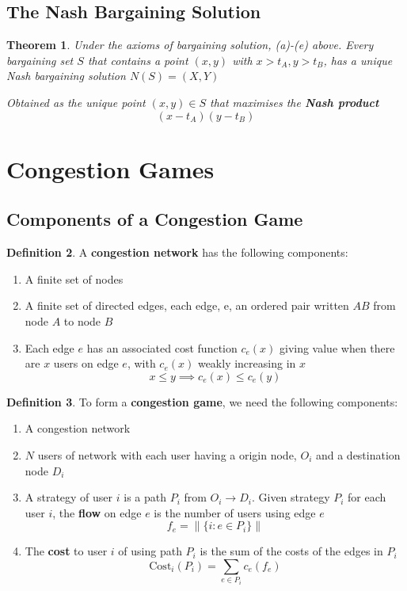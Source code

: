 \documentclass[11pt]{article}
\theoremstyle{plain}
\newtheorem{theorem}{Theorem}[section]
\theoremstyle{definition}
\newtheorem{definition}[theorem]{Definition}
\theoremstyle{remark}
\begin{document}
\subsection{The Nash Bargaining Solution}

\begin{theorem}
    Under the axioms of bargaining solution, (a)-(e) above. Every bargaining set \(S\) that contains a point \((x,y)\) with \(x > t_A, y > t_B\), has a unique Nash bargaining solution \(N(S) = (X,Y)\)

    Obtained as the unique point \((x,y) \in S\) that maximises the \textbf{Nash product}
    \[
        (x - t_{A})(y - t_{B})
    \]
\end{theorem}

\section{Congestion Games}

\setcounter{subsection}{4} 
\subsection{Components of a Congestion Game}
\setcounter{theorem}{33}

\begin{definition}
    A \textbf{congestion network} has the following components:
    \begin{enumerate}
        \item A finite set of nodes
        \item A finite set of directed edges, each edge, e, an ordered pair written \(AB\) from node \(A\) to node \(B\)
        \item Each edge \(e\) has an associated cost function \(c_{e}(x)\) giving value when there are \(x\) users on edge \(e\), with \(c_{e}(x)\) weakly increasing in \(x\)
        \[
            x \leq y \implies c_{e}(x) \leq c_{e}(y)
        \]
    \end{enumerate}
\end{definition}

\begin{definition}
    To form a \textbf{congestion game}, we need the following components:
    \begin{enumerate}
        \item A congestion network
        \item \(N\) users of network with each user having a origin node, \(O_{i}\) and a destination node \(D_{i}\) 
        \item A strategy of user \(i\) is a path \(P_{i}\) from \(O_{i} \to D_{i}\). Given strategy \(P_{i}\) for each user \(i\), the \textbf{flow} on edge \(e\) is the number of users using edge \(e\)
        \[
            f_{e} = \left\lVert \{i : e \in P_{i}\}\right\rVert 
        \]
        \item The \textbf{cost} to user \(i\) of using path \(P_{i}\) is the sum of the costs of the edges in \(P_{i}\)
        \[
            \text{Cost}_{i}(P_{i}) = \sum_{e \in P_{i}} c_{e}(f_{e})
        \]
    \end{enumerate}
\end{definition}
\end{document}
